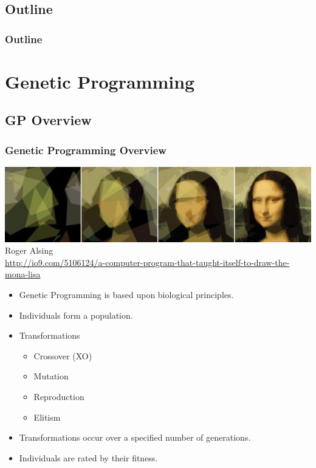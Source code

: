 \documentclass{beamer}
\begin{document}
\subsection*{Outline}

\begin{frame}
  \frametitle{Outline}
  \tableofcontents[hideallsubsections]
\end{frame}

\section[Genetic Programming]{Genetic Programming}

\subsection{GP Overview}

\begin{frame}
  \frametitle{Genetic Programming Overview}
  \begin{center}
  \includegraphics[width=.60\textwidth]{mona_lisa.jpg} \\
  \tiny{Roger Alsing \\ \url{http://io9.com/5106124/a-computer-program-that-taught-itself-to-draw-the-mona-lisa} }

  \end{center}
 
  \begin{itemize}
  	\item Genetic Programming is based upon biological principles.
	\item Individuals form a population.
	\item Transformations
		\begin{itemize}
		\item Crossover (XO)
		\item Mutation
		\item Reproduction
		\item Elitism
		\end{itemize}
	\item Transformations occur over a specified number of generations.
	\item Individuals are rated by their fitness.
  \end{itemize}
\end{frame}
\end{document}
